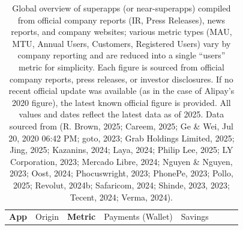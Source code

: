 \documentclass[
  12pt,
  letterpaper,
  DIV=11,
  numbers=noendperiod]{scrartcl}
\begin{document}
\begin{longtable}[]{@{}
  >{\raggedright\arraybackslash}p{}
  >{\raggedright\arraybackslash}p{}
  >{\raggedright\arraybackslash}p{}
  >{\raggedright\arraybackslash}p{}
  >{\raggedright\arraybackslash}p{}
  >{\raggedright\arraybackslash}p{}
  >{\raggedright\arraybackslash}p{}
  >{\raggedright\arraybackslash}p{}@{}}
\caption[Global Overview of Superapps]{Global overview of superapps (or
near-superapps) compiled from official company reports (IR, Press
Releases), news reports, and company websites; various metric types
(MAU, MTU, Annual Users, Customers, Registered Users) vary by company
reporting and are reduced into a single ``users'' metric for simplicity.
Each figure is sourced from official company reports, press releases, or
investor disclosures. If no recent official update was available (as in
the case of Alipay's 2020 figure), the latest known official figure is
provided. All values and dates reflect the latest data as of 2025. Data
sourced from (R. Brown, 2025; Careem, 2025; Ge \& Wei, Jul 20, 2020
06:42 PM; goto, 2023; Grab Holdings Limited, 2025; Jing, 2025; Kazanins,
2024; Laya, 2024; Philip Lee, 2025; LY Corporation, 2023; Mercado Libre,
2024; Nguyen \& Nguyen, 2023; Oost, 2024; Phocuswright, 2023; PhonePe,
2023; Pollo, 2025; Revolut, 2024b; Safaricom, 2024; Shinde, 2023, 2023;
Tecent, 2024; Verma, 2024).}\tabularnewline
\toprule\noalign{}
\begin{minipage}[b]{\linewidth}\raggedright
\textbf{App}
\end{minipage} & \begin{minipage}[b]{\linewidth}\raggedright
Origin
\end{minipage} & \begin{minipage}[b]{\linewidth}\raggedright
\textbf{Metric}
\end{minipage} & \begin{minipage}[b]{\linewidth}\raggedright
Payments (Wallet)
\end{minipage} & \begin{minipage}[b]{\linewidth}\raggedright
Savings
\end{minipage} & \begin{minipage}[b]{\linewidth}\raggedright

\end{minipage}
\end{longtable}
\end{document}
